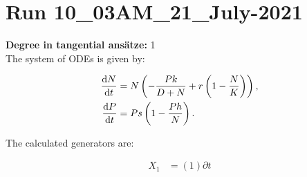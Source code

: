 \section*{Run 10\_03AM\_21\_July-2021}
\textbf{Degree in tangential ansätze:}	1\\
The system of ODEs is given by:

\begin{align*}
\dv{N}{t}&=N \left(- \frac{P k}{D + N} + r \left(1 - \frac{N}{K}\right)\right),\\
\dv{P}{t}&=P s \left(1 - \frac{P h}{N}\right).\\
\end{align*}

\noindent The calculated generators are:

\begin{align*}
X_{1}&=\left( 1 \right)\partial t\end{align*}
